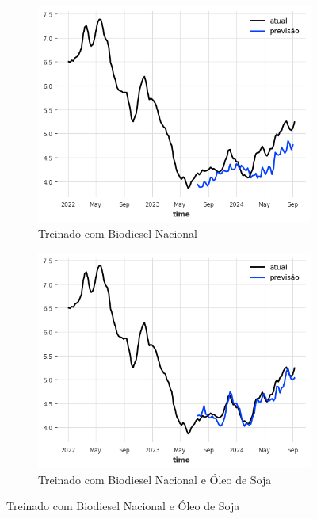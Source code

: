 \begin{figure}[htbp]
	\centering
	\begin{subfigure}[b]{0.45\textwidth}
		\centering
		\includegraphics[width=\textwidth]{figuras/narx_brasil_plot.png} %
		\caption{Treinado com Biodiesel Nacional \newline}
		\label{fig:narx_brasil_plot}
	\end{subfigure}
	\hfill
	\begin{subfigure}[b]{0.45\textwidth}
		\centering
		\includegraphics[width=\textwidth]{figuras/narx_brasil_oil_plot.png} %
		\caption{Treinado com Biodiesel Nacional e Óleo de Soja}
		\label{fig:narx_brasil_oil_plot}
	\end{subfigure}


\end{figure}
